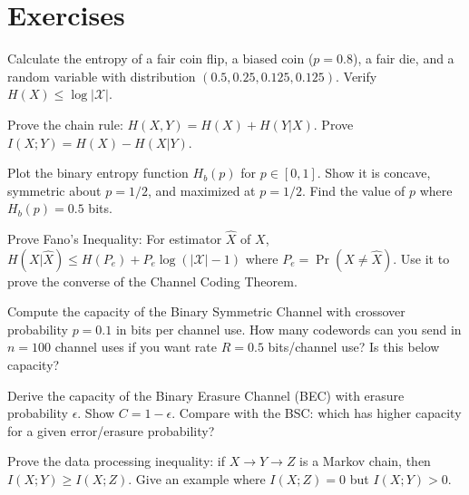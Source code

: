 \section{Exercises}
\label{sec:information:exercises}

\begin{exercise}[Basic]
Calculate the entropy of a fair coin flip, a biased coin ($p=0.8$), a fair die, and a random variable with distribution $(0.5, 0.25, 0.125, 0.125)$. Verify $H(X) \le \log |\mathcal{X}|$.
\end{exercise}

\begin{exercise}[Basic]
Prove the chain rule: $H(X,Y) = H(X) + H(Y|X)$. Prove $I(X;Y) = H(X) - H(X|Y)$.
\end{exercise}

\begin{exercise}[Basic]
Plot the binary entropy function $H_b(p)$ for $p \in [0,1]$. Show it is concave, symmetric about $p=1/2$, and maximized at $p=1/2$. Find the value of $p$ where $H_b(p) = 0.5$ bits.
\end{exercise}

\begin{exercise}[Intermediate]
Prove Fano's Inequality: For estimator $\hat{X}$ of $X$, $H(X|\hat{X}) \le H(P_e) + P_e \log(|\mathcal{X}|-1)$ where $P_e = \Pr(X \neq \hat{X})$. Use it to prove the converse of the Channel Coding Theorem.
\end{exercise}

\begin{exercise}[Intermediate]
Compute the capacity of the Binary Symmetric Channel with crossover probability $p=0.1$ in bits per channel use. How many codewords can you send in $n=100$ channel uses if you want rate $R = 0.5$ bits/channel use? Is this below capacity?
\end{exercise}

\begin{exercise}[Intermediate]
Derive the capacity of the Binary Erasure Channel (BEC) with erasure probability $\epsilon$. Show $C = 1-\epsilon$. Compare with the BSC: which has higher capacity for a given error/erasure probability?
\end{exercise}

\begin{exercise}[Intermediate]
Prove the data processing inequality: if $X \to Y \to Z$ is a Markov chain, then $I(X;Y) \ge I(X;Z)$. Give an example where $I(X;Z) = 0$ but $I(X;Y) > 0$.
\end{exercise}


